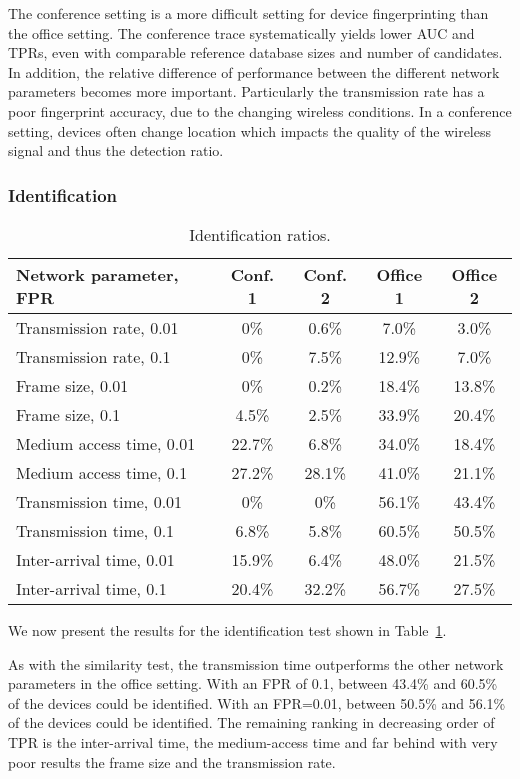 \documentclass[10pt, conference, compsocconf, letterpaper]{IEEEtran}
\begin{document}
The conference setting is a more difficult setting for device fingerprinting than the office setting. The conference trace systematically yields lower AUC and TPRs, even with comparable reference database sizes and number of candidates. In addition, the relative difference of performance between the different network parameters becomes more important. Particularly the transmission rate has a poor fingerprint accuracy, due to the changing wireless conditions. In a conference setting, devices often change location which impacts the quality of the wireless signal and thus the detection ratio.



\subsubsection{Identification}

\begin{table}
{\footnotesize
\begin{center}
\begin{tabular}{l|c|c|c|c}
 Network parameter, FPR &  Conf. 1 & Conf. 2 &  Office 1 & Office 2 \\
\hline
Transmission rate, 0.01& 0\%&0.6\%&7.0\%&3.0\%\\
Transmission rate, 0.1& 0\%&7.5\%&12.9\%&7.0\%\\
Frame size, 0.01& 0\%& 0.2\%&18.4\%&13.8\%\\
Frame size, 0.1&  4.5\%& 2.5\%&33.9\%&20.4\%\\
Medium access time, 0.01&  22.7\%& 6.8\%&34.0\%&18.4\%\\
Medium access time, 0.1&  27.2\%& 28.1\%&41.0\%&21.1\%\\
Transmission time, 0.01&  0\%& 0\%&56.1\%&43.4\%\\
Transmission time, 0.1&  6.8\%& 5.8\%&60.5\%&50.5\%\\
Inter-arrival time, 0.01&  15.9\%& 6.4\%&48.0\%&21.5\%\\
Inter-arrival time, 0.1&  20.4\%& 32.2\%&56.7\%&27.5\%\\
\end{tabular}
\end{center}
}
\caption{Identification ratios.}
\label{tab:idratios}
\end{table}

We now present the results for the identification test shown in Table~\ref{tab:idratios}.

As with the similarity test, the transmission time outperforms the other network parameters in the office setting. 
With an FPR of 0.1, between 43.4\% and  60.5\% of the devices could be identified. With an FPR=0.01, between 50.5\% and 56.1\% of the devices could be identified. The remaining ranking in decreasing order of TPR is the inter-arrival time, the medium-access time and far behind with very poor results the frame size and the transmission rate.
\end{document}
